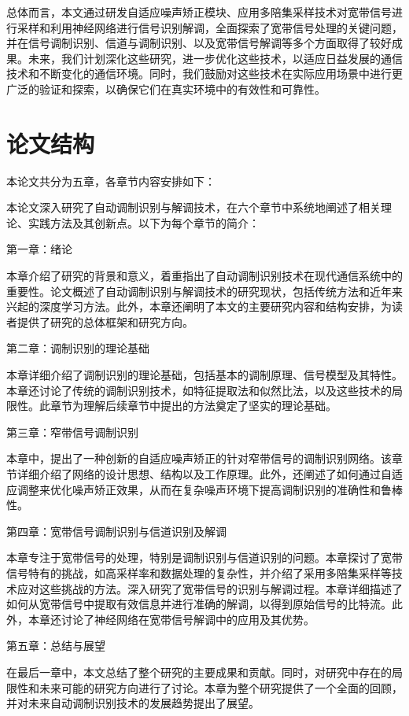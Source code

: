 总体而言，本文通过研发自适应噪声矫正模块、应用多陪集采样技术对宽带信号进行采样和利用神经网络进行信号识别解调，全面探索了宽带信号处理的关键问题，并在信号调制识别、信道与调制识别、以及宽带信号解调等多个方面取得了较好成果。未来，我们计划深化这些研究，进一步优化这些技术，以适应日益发展的通信技术和不断变化的通信环境。同时，我们鼓励对这些技术在实际应用场景中进行更广泛的验证和探索，以确保它们在真实环境中的有效性和可靠性。

\section{论文结构}\label{sec:background}
本论文共分为五章，各章节内容安排如下：

本论文深入研究了自动调制识别与解调技术，在六个章节中系统地阐述了相关理论、实践方法及其创新点。以下为每个章节的简介：

第一章：绪论

本章介绍了研究的背景和意义，着重指出了自动调制识别技术在现代通信系统中的重要性。论文概述了自动调制识别与解调技术的研究现状，包括传统方法和近年来兴起的深度学习方法。此外，本章还阐明了本文的主要研究内容和结构安排，为读者提供了研究的总体框架和研究方向。

第二章：调制识别的理论基础

本章详细介绍了调制识别的理论基础，包括基本的调制原理、信号模型及其特性。本章还讨论了传统的调制识别技术，如特征提取法和似然比法，以及这些技术的局限性。此章节为理解后续章节中提出的方法奠定了坚实的理论基础。

第三章：窄带信号调制识别

本章中，提出了一种创新的自适应噪声矫正的针对窄带信号的调制识别网络。该章节详细介绍了网络的设计思想、结构以及工作原理。此外，还阐述了如何通过自适应调整来优化噪声矫正效果，从而在复杂噪声环境下提高调制识别的准确性和鲁棒性。

第四章：宽带信号调制识别与信道识别及解调

本章专注于宽带信号的处理，特别是调制识别与信道识别的问题。本章探讨了宽带信号特有的挑战，如高采样率和数据处理的复杂性，并介绍了采用多陪集采样等技术应对这些挑战的方法。深入研究了宽带信号的识别与解调过程。本章详细描述了如何从宽带信号中提取有效信息并进行准确的解调，以得到原始信号的比特流。此外，本章还讨论了神经网络在宽带信号解调中的应用及其优势。

第五章：总结与展望

在最后一章中，本文总结了整个研究的主要成果和贡献。同时，对研究中存在的局限性和未来可能的研究方向进行了讨论。本章为整个研究提供了一个全面的回顾，并对未来自动调制识别技术的发展趋势提出了展望。

